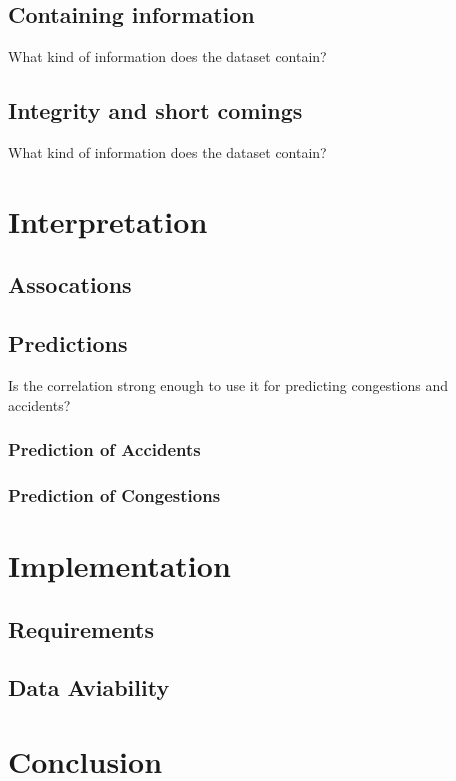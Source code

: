 \documentclass[a4paper,12pt]{report}
\begin{document}
\section{Containing information}
What kind of information does the dataset contain?
\section{Integrity and short comings}
What kind of information does the dataset contain?

\chapter{Interpretation}

\section{Assocations}

\section{Predictions}
Is the correlation strong enough to use it for predicting congestions and accidents?

\subsection{Prediction of Accidents}

\subsection{Prediction of Congestions}

\chapter{Implementation}

\section{Requirements}

\section{Data Aviability}

\chapter{Conclusion}
\end{document}
